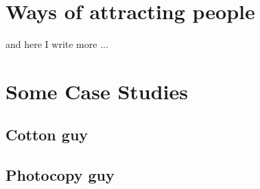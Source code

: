\section{Ways of attracting people}
and here I write more ...

\section{Some Case Studies}

\subsection{Cotton guy}

\subsection{Photocopy guy}



